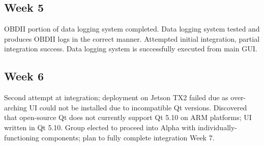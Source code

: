 \documentclass[onecolumn, draftclsnofoot,10pt, compsoc]{IEEEtran}
\begin{document}
\subsection{Week 5}
OBDII portion of data logging system completed. Data logging system tested and produces OBDII logs in the correct manner. Attempted initial integration, partial integration success. Data logging system is successfully executed from main GUI. 

\subsection{Week 6}
Second attempt at integration; deployment on Jetson TX2 failed due as over-arching UI could not be installed due to incompatible Qt versions. Discovered that open-source Qt does not currently support Qt 5.10 on ARM platforms; UI written in Qt 5.10. Group elected to proceed into Alpha with individually-functioning components; plan to fully complete integration Week 7.
\end{document}
